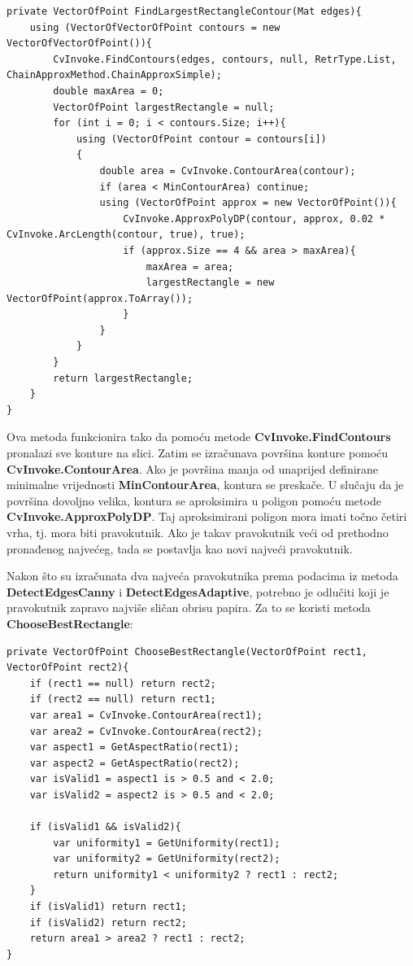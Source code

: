\documentclass{foi}
\begin{document}
\pagebreak
\begin{lstlisting}[caption={Metoda za pronalazak najvećeg pravokutnika koji predstavlja papir}]
private VectorOfPoint FindLargestRectangleContour(Mat edges){
    using (VectorOfVectorOfPoint contours = new VectorOfVectorOfPoint()){
        CvInvoke.FindContours(edges, contours, null, RetrType.List, ChainApproxMethod.ChainApproxSimple);
        double maxArea = 0;
        VectorOfPoint largestRectangle = null;
        for (int i = 0; i < contours.Size; i++){
            using (VectorOfPoint contour = contours[i])
            {
                double area = CvInvoke.ContourArea(contour);
                if (area < MinContourArea) continue;
                using (VectorOfPoint approx = new VectorOfPoint()){
                    CvInvoke.ApproxPolyDP(contour, approx, 0.02 * CvInvoke.ArcLength(contour, true), true);
                    if (approx.Size == 4 && area > maxArea){
                        maxArea = area;
                        largestRectangle = new VectorOfPoint(approx.ToArray());
                    }
                }
            }
        }
        return largestRectangle;
    }
}
\end{lstlisting}

Ova metoda funkcionira tako da pomoću metode \textbf{CvInvoke.FindContours} pronalazi sve konture na slici. Zatim se izračunava površina konture pomoću \textbf{CvInvoke.ContourArea}. Ako je površina manja od unaprijed definirane minimalne vrijednosti \textbf{MinContourArea}, kontura se preskače. U slučaju da je površina dovoljno velika, kontura se aproksimira u poligon pomoću metode \textbf{CvInvoke.ApproxPolyDP}. Taj aproksimirani poligon mora imati točno četiri vrha, tj. mora biti pravokutnik. Ako je takav pravokutnik veći od prethodno pronađenog najvećeg, tada se postavlja kao novi najveći pravokutnik.


Nakon što su izračunata dva najveća pravokutnika prema podacima iz metoda \textbf{DetectEdgesCanny} i \textbf{DetectEdgesAdaptive}, potrebno je odlučiti koji je pravokutnik zapravo najviše sličan obrisu papira. Za to se koristi metoda \textbf{ChooseBestRectangle}:
\pagebreak
\begin{lstlisting}[caption={Metoda za odabir najboljeg pravokutnika}]
private VectorOfPoint ChooseBestRectangle(VectorOfPoint rect1, VectorOfPoint rect2){
    if (rect1 == null) return rect2;
    if (rect2 == null) return rect1;
    var area1 = CvInvoke.ContourArea(rect1);
    var area2 = CvInvoke.ContourArea(rect2);
    var aspect1 = GetAspectRatio(rect1);
    var aspect2 = GetAspectRatio(rect2);
    var isValid1 = aspect1 is > 0.5 and < 2.0;
    var isValid2 = aspect2 is > 0.5 and < 2.0;

    if (isValid1 && isValid2){
        var uniformity1 = GetUniformity(rect1);
        var uniformity2 = GetUniformity(rect2);
        return uniformity1 < uniformity2 ? rect1 : rect2;
    }
    if (isValid1) return rect1;
    if (isValid2) return rect2;
    return area1 > area2 ? rect1 : rect2;
}
\end{lstlisting}
\end{document}
